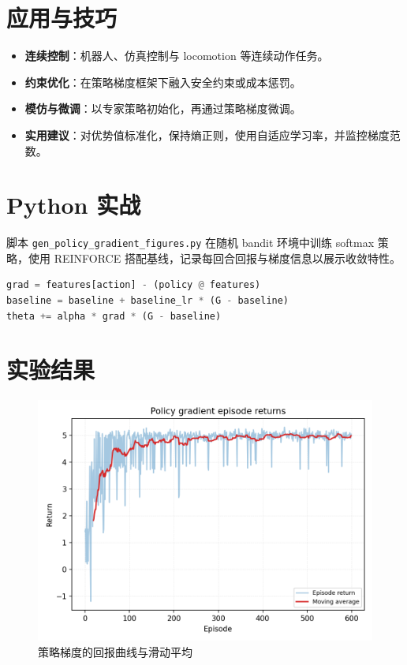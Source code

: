 \documentclass[UTF8,zihao=-4]{ctexart}
\begin{document}
\section{应用与技巧}
\begin{itemize}
  \item \textbf{连续控制}：机器人、仿真控制与 locomotion 等连续动作任务。
  \item \textbf{约束优化}：在策略梯度框架下融入安全约束或成本惩罚。
  \item \textbf{模仿与微调}：以专家策略初始化，再通过策略梯度微调。
  \item \textbf{实用建议}：对优势值标准化，保持熵正则，使用自适应学习率，并监控梯度范数。
\end{itemize}

\section{Python 实战}
脚本 \texttt{gen\_policy\_gradient\_figures.py} 在随机 bandit 环境中训练 softmax 策略，使用 REINFORCE 搭配基线，记录每回合回报与梯度信息以展示收敛特性。
\begin{lstlisting}[language=Python,caption={脚本 gen_policy_gradient_figures.py 片段}]
grad = features[action] - (policy @ features)
baseline = baseline + baseline_lr * (G - baseline)
theta += alpha * grad * (G - baseline)
\end{lstlisting}

\section{实验结果}
\begin{figure}[H]
  \centering
  \includegraphics[width=0.8\linewidth]{policy_gradient_returns.png}
  \caption{策略梯度的回报曲线与滑动平均}
  \label{fig:policy_gradient_returns_cn}
\end{figure}
\end{document}
